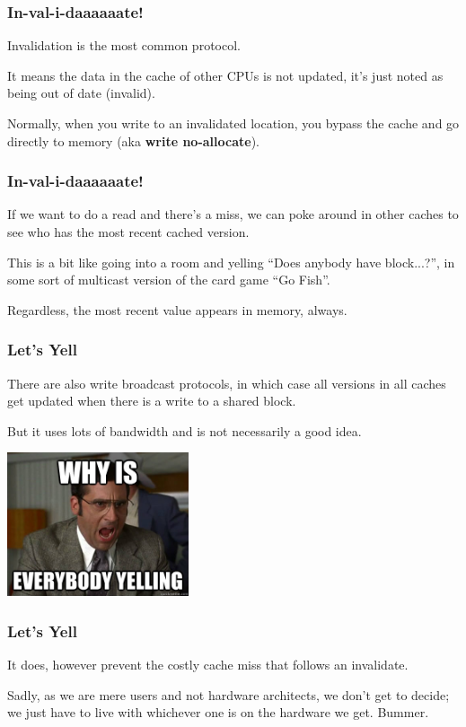 \begin{frame}
\frametitle{In-val-i-daaaaaate!}

Invalidation is the most common protocol. 

It means the data in the cache of other CPUs is not updated, it's just noted as being out of date (invalid).  

Normally, when you write to an invalidated location, you bypass the cache and go directly to memory (aka {\bf write no-allocate}). 

\end{frame}


\begin{frame}
\frametitle{In-val-i-daaaaaate!}
If we want to do a read and there's a miss, we can poke around in other caches to see who has the most recent cached version. 

This is a bit like going into a room and yelling ``Does anybody have block...?'', in some sort of multicast version of the card game ``Go Fish''. 


Regardless, the most recent value appears in memory, always.


\end{frame}



\begin{frame}
\frametitle{Let's Yell}

There are also write broadcast protocols, in which case all versions in all caches get updated when there is a write to a shared block. 

But it uses lots of bandwidth and is not necessarily a good idea. 

\begin{center}
	\includegraphics[width=0.4\textwidth]{images/multicast.jpg}
\end{center}

\end{frame}



\begin{frame}
\frametitle{Let's Yell}

It does, however prevent the costly cache miss that follows an invalidate. 

Sadly, as we are mere users and not hardware architects, we don't get to decide; we just have to live with whichever one is on the hardware we get. Bummer.


\end{frame}

